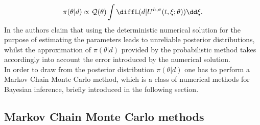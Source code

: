 \begin{equation}
	 	\pi(\theta|d) \propto \mathcal{Q}(\theta) \int{\diffL(d|U^{h,\sigma}(t,\xi;\theta))\dd\xi}.
 \end{equation}
 In \cite{CGS16} the authors claim that using the deterministic numerical solution for the purpose of estimating the parameters leads to unreliable posterior distributions, whilst the approximation of $\pi(\theta|d)$ provided by the probabilistic method takes accordingly into account the error introduced by the numerical solution. \\
 In order to draw from the posterior distribution $\pi(\theta|d)$ one has to perform a Markov Chain Monte Carlo method, which is a class of numerical methods for Bayesian inference, briefly introduced in the following section.
 
\subsection{Markov Chain Monte Carlo methods}



